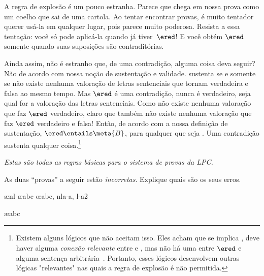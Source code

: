 A regra de explosão é um pouco estranha. Parece que    chega em nossa prova como um coelho que sai de uma cartola. Ao tentar encontrar provas, é muito tentador querer usá-la em qualquer lugar, pois parece muito poderosa. Resista a essa tentação: você só pode aplicá-la quando já tiver~$\ered$!   E você obtém $\ered$   somente quando suas suposições são contraditórias.
 

Ainda assim, não é estranho que, de uma contradição, alguma coisa deva seguir? Não de acordo com nossa noção de sustentação e validade.  sustenta  se e somente se não existe nenhuma valoração de letras sentenciais que tornam  verdadeira e  falsa ao mesmo tempo. Mas $\ered$ é uma contradição, nunca é verdadeiro, seja qual for a valoração das letras sentenciais.  Como não existe nenhuma valoração que faz $\ered$ verdadeiro, claro que também não existe nenhuma valoração que faz  $\ered$  verdadeiro e  falsa! Então, de acordo com a nossa definição de sustentação,  $\ered \entails \meta{B}$,  para qualquer que seja . Uma contradição sustenta qualquer coisa.\footnote{Existem alguns lógicos que não aceitam isso. Eles acham que se  implica , deve haver alguma \emph{conexão relevante} entre  e , mas não há uma entre $\ered$ e alguma sentença arbitrária~. Portanto, esses lógicos desenvolvem outras lógicas "relevantes" nas quais  a regra de explosão é não permitida.}

\emph{Estas são todas as regras básicas para o sistema de provas da LPC.}


\practiceproblems

\problempart
As duas ``provas'' a seguir estão  \emph{incorretas}. Explique quais são os seus erros.
\begin{fitchproof}
\open
{}
\ae{nl}
	\ae{abc}
\close
\open
\close
{}\oe{abc, nla-a, l-a2}
\end{fitchproof}

\begin{fitchproof}
\ae{abc}
\end{fitchproof}

